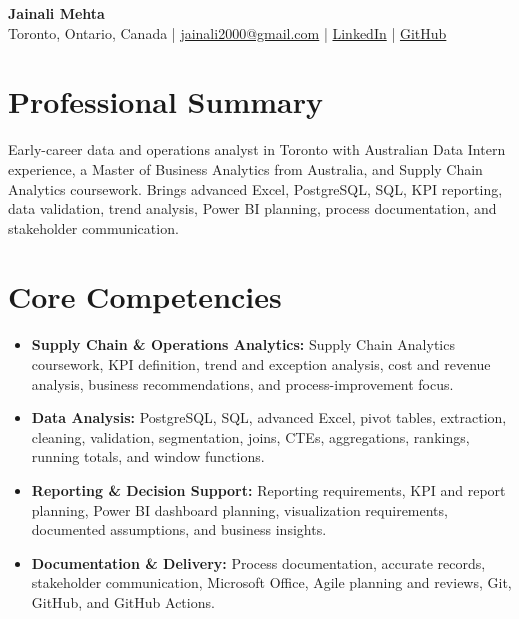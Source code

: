\documentclass[letterpaper,10pt]{article}
\begin{document}
\begin{center}
  {\fontsize{17}{19}\selectfont\textbf{Jainali Mehta}}\\[2pt]
  \small Toronto, Ontario, Canada \;|\;
  \href{mailto:jainali2000@gmail.com}{jainali2000@gmail.com} \;|\;
  \href{https://www.linkedin.com/in/jainali-mehta}{LinkedIn} \;|\;
  \href{https://github.com/jainalimehta}{GitHub}
\end{center}
\vspace{-7pt}

\section{Professional Summary}
\small Early-career data and operations analyst in Toronto with Australian Data Intern experience, a Master of Business Analytics from Australia, and Supply Chain Analytics coursework. Brings advanced Excel, PostgreSQL, SQL, KPI reporting, data validation, trend analysis, Power BI planning, process documentation, and stakeholder communication.

\section{Core Competencies}
\begin{itemize}[leftmargin=0.16in,label=\textbullet,topsep=0pt,itemsep=1pt,parsep=0pt]
  \item \small \textbf{Supply Chain \& Operations Analytics:} Supply Chain Analytics coursework, KPI definition, trend and exception analysis, cost and revenue analysis, business recommendations, and process-improvement focus.
  \item \small \textbf{Data Analysis:} PostgreSQL, SQL, advanced Excel, pivot tables, extraction, cleaning, validation, segmentation, joins, CTEs, aggregations, rankings, running totals, and window functions.
  \item \small \textbf{Reporting \& Decision Support:} Reporting requirements, KPI and report planning, Power BI dashboard planning, visualization requirements, documented assumptions, and business insights.
  \item \small \textbf{Documentation \& Delivery:} Process documentation, accurate records, stakeholder communication, Microsoft Office, Agile planning and reviews, Git, GitHub, and GitHub Actions.
\end{itemize}
\end{document}
